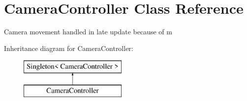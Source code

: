 \hypertarget{class_camera_controller}{}\section{Camera\+Controller Class Reference}
\label{class_camera_controller}


Camera movement handled in late update because of m  


Inheritance diagram for Camera\+Controller\+:\begin{figure}[H]
\begin{center}
\leavevmode
\includegraphics[height=2.000000cm]{class_camera_controller}
\end{center}
\end{figure}
